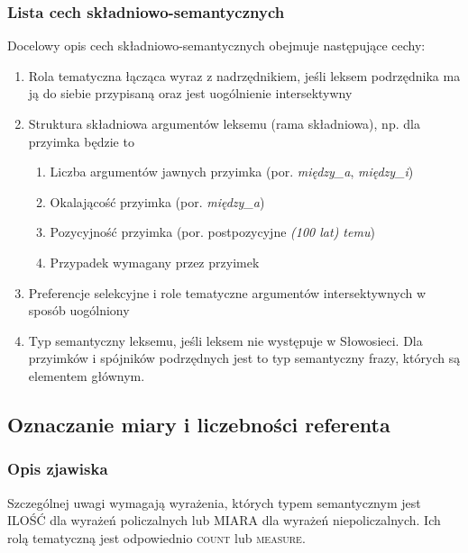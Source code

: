 \documentclass[a4paper, 12pt]{article}
\theoremstyle{remark}
\begin{document}
\subsubsection{Lista cech składniowo-semantycznych} %
\label{sub:cechy_ala_Walenty}

Docelowy opis cech składniowo-semantycznych obejmuje następujące cechy:

\begin{enumerate}
\item Rola tematyczna łącząca wyraz z nadrzędnikiem, jeśli leksem podrzędnika ma ją do siebie przypisaną oraz jest uogólnienie intersektywny
\item Struktura składniowa argumentów leksemu (rama składniowa), np. dla przyimka będzie to
\begin{enumerate}
\item Liczba argumentów jawnych przyimka (por. \emph{między\_a}, \emph{między\_i})
\item Okalającość przyimka (por. \emph{między\_a})
\item Pozycyjność przyimka (por. postpozycyjne  \emph{(100 lat) temu})
\item Przypadek wymagany przez przyimek
\end{enumerate}

\item Preferencje selekcyjne i role tematyczne argumentów intersektywnych w sposób uogólniony
\item Typ semantyczny leksemu, jeśli leksem nie występuje w Słowosieci. Dla przyimków i spójników podrzędnych jest to typ semantyczny frazy, których są elementem głównym.
\end{enumerate}

\subsection{Oznaczanie miary i liczebności referenta} %
{
\renewcommand\thesubsection{}
\renewcommand\thesubsubsection{}
\setcounter{subsection}{-1}
\subsubsection{Opis zjawiska} %
\label{sub:opis_zjawiska4}
}

Szczególnej uwagi wymagają wyrażenia, których typem semantycznym jest \textsf{ILOŚĆ} dla wyrażeń policzalnych lub \textsf{MIARA} dla wyrażeń niepoliczalnych. Ich rolą tematyczną jest odpowiednio \textsc{count} lub \textsc{measure}.
\end{document}
